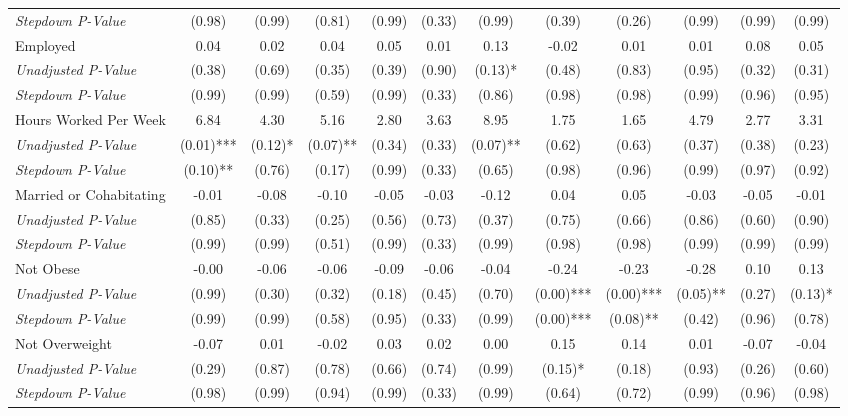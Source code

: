 \begin{tabular}{l c c c c c c c c c c c}
\quad \textit{Stepdown P-Value} & (0.98) & (0.99) & (0.81) & (0.99) & (0.33) & (0.99) & (0.39) & (0.26) & (0.99) & (0.99) & (0.99) \\
Employed & 0.04 & 0.02 & 0.04 & 0.05 & 0.01 & 0.13 & -0.02 & 0.01 & 0.01 & 0.08 & 0.05 \\
\quad \textit{Unadjusted P-Value} & (0.38) & (0.69) & (0.35) & (0.39) & (0.90) & (0.13)* & (0.48) & (0.83) & (0.95) & (0.32) & (0.31) \\
\quad \textit{Stepdown P-Value} & (0.99) & (0.99) & (0.59) & (0.99) & (0.33) & (0.86) & (0.98) & (0.98) & (0.99) & (0.96) & (0.95) \\
Hours Worked Per Week & 6.84 & 4.30 & 5.16 & 2.80 & 3.63 & 8.95 & 1.75 & 1.65 & 4.79 & 2.77 & 3.31 \\
\quad \textit{Unadjusted P-Value} & (0.01)*** & (0.12)* & (0.07)** & (0.34) & (0.33) & (0.07)** & (0.62) & (0.63) & (0.37) & (0.38) & (0.23) \\
\quad \textit{Stepdown P-Value} & (0.10)** & (0.76) & (0.17) & (0.99) & (0.33) & (0.65) & (0.98) & (0.96) & (0.99) & (0.97) & (0.92) \\
Married or Cohabitating & -0.01 & -0.08 & -0.10 & -0.05 & -0.03 & -0.12 & 0.04 & 0.05 & -0.03 & -0.05 & -0.01 \\
\quad \textit{Unadjusted P-Value} & (0.85) & (0.33) & (0.25) & (0.56) & (0.73) & (0.37) & (0.75) & (0.66) & (0.86) & (0.60) & (0.90) \\
\quad \textit{Stepdown P-Value} & (0.99) & (0.99) & (0.51) & (0.99) & (0.33) & (0.99) & (0.98) & (0.98) & (0.99) & (0.99) & (0.99) \\
Not Obese & -0.00 & -0.06 & -0.06 & -0.09 & -0.06 & -0.04 & -0.24 & -0.23 & -0.28 & 0.10 & 0.13 \\
\quad \textit{Unadjusted P-Value} & (0.99) & (0.30) & (0.32) & (0.18) & (0.45) & (0.70) & (0.00)*** & (0.00)*** & (0.05)** & (0.27) & (0.13)* \\
\quad \textit{Stepdown P-Value} & (0.99) & (0.99) & (0.58) & (0.95) & (0.33) & (0.99) & (0.00)*** & (0.08)** & (0.42) & (0.96) & (0.78) \\
Not Overweight & -0.07 & 0.01 & -0.02 & 0.03 & 0.02 & 0.00 & 0.15 & 0.14 & 0.01 & -0.07 & -0.04 \\
\quad \textit{Unadjusted P-Value} & (0.29) & (0.87) & (0.78) & (0.66) & (0.74) & (0.99) & (0.15)* & (0.18) & (0.93) & (0.26) & (0.60) \\
\quad \textit{Stepdown P-Value} & (0.98) & (0.99) & (0.94) & (0.99) & (0.33) & (0.99) & (0.64) & (0.72) & (0.99) & (0.96) & (0.98) \\

\end{tabular}
